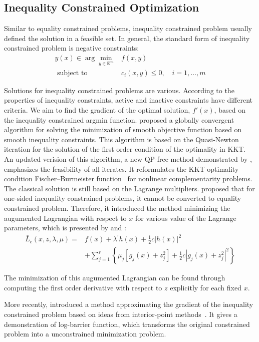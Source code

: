 \subsection{Inequality Constrained Optimization}
Similar to equality constrained problems, inequality constrained problem usually defined the solution in a feasible set. In general, the standard form of inequality constrained problem is negative constraints:
$$
\begin{array}{rl}y(x) \in \arg \min _{y \in \mathbb{R}^{m}} & f(x, y) \\ \textrm { subject to } & c_i(x, y) \leq 0, \quad i = 1, \dots, m \end{array}
$$
\par Solutions for inequality constrained problems are various. According to the properties of inequality constraints, active and inactive constraints have different criteria. We aim to find the gradient of the optimal solution, $f\prime (x)$, based on the inequality constrained argmin function. 
 \cite{PE:88} proposed a globally convergent algorithm for solving the minimization of smooth objective function based on smooth inequality constraints. This algorithm is based on the Quasi-Newton~\citep{DJ:77} iteration for the solution of the first order condition of the optimality in KKT. An updated verision of this algorithm, a new QP-free method demonstrated by \cite{QH:00}, emphasizes the feasibility of all iterates. It reformulates the KKT optimality condition Fischer–Burmeister function~\citep{JH:99} for nonlinear complementarity problems. The classical solution is still based on the Lagrange multipliers. \cite{BD:14} proposed that for one-sided inequality constrained problems, it cannot be converted to equality constrained problem. Therefore, it introduced the method minimizing the augumented Lagrangian with respect to $x$ for various value of the Lagrange parameters, which is presented by \cite{PM:69} and \cite{HM:69}: 
 $$
 \begin{aligned} \bar{L}_{c}(x, z, \lambda, \mu)=& f(x)+\lambda^{\prime} h(x)+\frac{1}{2} c|h(x)|^{2} \\ &+\sum_{j=1}^{r}\left\{\mu_{j}\left[g_{j}(x)+z_{j}^{2}\right]+\frac{1}{2} c\left|g_{j}(x)+z_{j}^{2}\right|^{2}\right\} \end{aligned}
 $$
 \par The minimization of this augumented Lagrangian can be found through computing the first order derivative with respect to $z$ explicitly for each fixed $x$. 
\par More recently, \cite{SG:16} introduced a method approximating the gradient of the inequality constrained problem based on ideas from interior-point methods~\citep{BS:04}. It gives a demonstration of log-barrier function, which transforms the original constrained problem into a unconstrained minimization problem.
